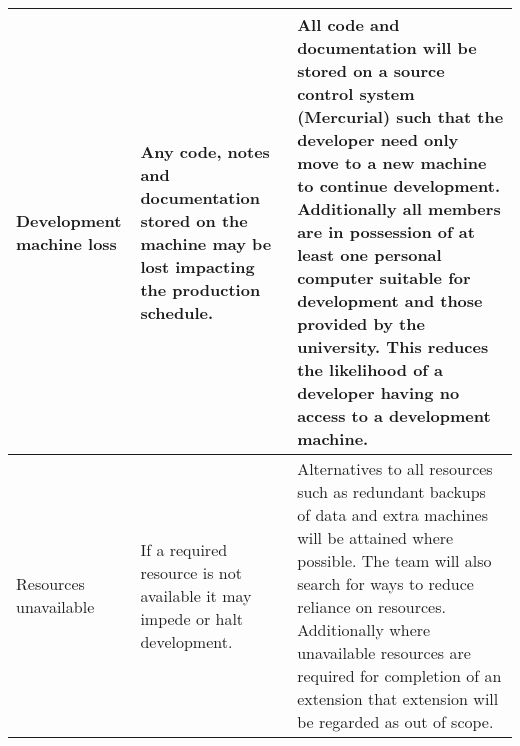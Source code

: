 \begin{center}
\begin{landscape}
\begin{longtable}{|p{3cm}|p{7cm}|p{12cm}|}
        Development machine loss                         & Any code, notes and documentation stored on the machine may be lost impacting the production schedule.                                                                                                                                                                                                                                                                       & All code and documentation will be stored on a source control system (Mercurial) such that the developer need only move to a new machine to continue development. Additionally all members are in possession of at least one personal computer suitable for development and those provided by the university. This reduces the likelihood of a developer having no access to a development machine.                                                                                                                                                                                                                                                                                                                                                                                                                                                                                                                                                                                                                                      \\ \hline
        Resources unavailable                            & If a required resource is not available it may impede or halt development.                                                                                                                                                                                                                                                                                                   & Alternatives to all resources such as redundant backups of data and extra machines will be attained where possible. The team will also search for ways to reduce reliance on resources. Additionally where unavailable resources are required for completion of an extension that extension will be regarded as out of scope.                                                                                                                                                                                                                                                                                                                                                                                                                                                                                                                                                                                                                                                                                                            \\ \hline

\end{longtable}
\end{landscape}
\end{center}
